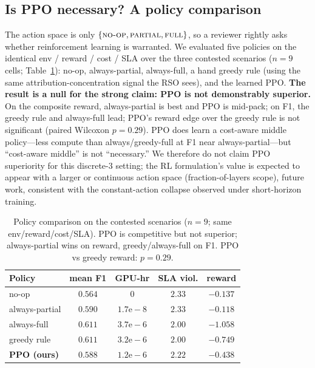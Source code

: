 \documentclass[conference]{IEEEtran}
\begin{document}
\subsection{Is PPO necessary? A policy comparison}\label{sec:ppo-necessity}
The action space is only $\{\textsc{no-op},\textsc{partial},\textsc{full}\}$,
so a reviewer rightly asks whether reinforcement learning is warranted. We
evaluated five policies on the identical env / reward / cost / SLA over
the three contested scenarios ($n{=}9$ cells; Table~\ref{tab:ppo}): no-op,
always-partial, always-full, a hand greedy rule (using the same
attribution-concentration signal the RSO sees), and the learned PPO.
\textbf{The result is a null for the strong claim: PPO is not demonstrably
superior.} On the composite reward, always-partial is best and PPO is
mid-pack; on F1, the greedy rule and always-full lead; PPO's reward edge
over the greedy rule is not significant (paired Wilcoxon $p=0.29$). PPO
does learn a cost-aware middle policy---less compute than always/greedy-full
at F1 near always-partial---but ``cost-aware middle'' is not ``necessary.''
We therefore do not claim PPO superiority for this discrete-3 setting; the
RL formulation's value is expected to appear with a larger or continuous
action space (fraction-of-layers scope), future work, consistent with the
constant-action collapse observed under short-horizon training.

\begin{table}[t]
\centering
\caption{Policy comparison on the contested scenarios ($n{=}9$; same
env/reward/cost/SLA). PPO is competitive but not superior; always-partial
wins on reward, greedy/always-full on F1. PPO vs greedy reward: $p=0.29$.}
\label{tab:ppo}
\setlength{\tabcolsep}{4pt}
\begin{tabular}{@{}lcccc@{}}
\toprule
\textbf{Policy} & \textbf{mean F1} & \textbf{GPU-hr} & \textbf{SLA viol.} & \textbf{reward}\\
\midrule
no-op            & $0.564$ & $0$        & $2.33$ & $-0.137$\\
always-partial   & $0.590$ & $1.7\mathrm{e}{-}8$ & $2.33$ & $\mathbf{-0.118}$\\
always-full      & $0.611$ & $3.7\mathrm{e}{-}6$ & $2.00$ & $-1.058$\\
greedy rule      & $\mathbf{0.611}$ & $3.2\mathrm{e}{-}6$ & $2.00$ & $-0.749$\\
\textbf{PPO (ours)} & $0.588$ & $1.2\mathrm{e}{-}6$ & $2.22$ & $-0.438$\\
\bottomrule
\end{tabular}
\end{table}
\end{document}
